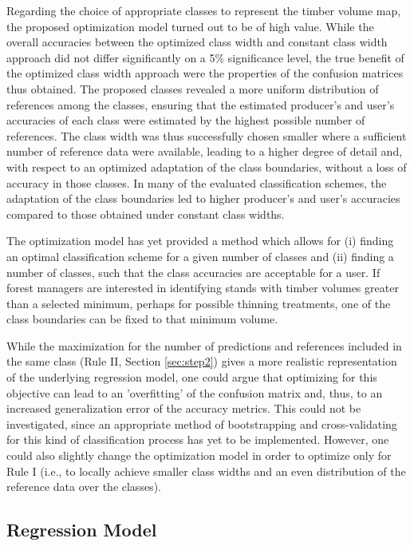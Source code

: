 Regarding the choice of appropriate classes to represent the timber volume map, the proposed optimization model turned out to be of high value. While the overall accuracies between the optimized class width and constant class width approach did not differ significantly on a 5\% significance level, the true benefit of the optimized class width approach were the properties of the confusion matrices thus obtained. The proposed classes revealed a more uniform distribution of references among the classes, ensuring that the estimated producer's and user's accuracies of each class were estimated by the highest possible number of references. The class width was thus successfully chosen smaller where a sufficient number of reference data were available, leading to a higher degree of detail and, with respect to an optimized adaptation of the class boundaries, without a loss of accuracy in those classes. In many of the evaluated classification schemes, the adaptation of the class boundaries led to higher producer's and user's accuracies compared to those obtained under constant class widths.\par
The optimization model has yet provided a method which allows for (i) finding an optimal classification scheme for a given number of classes and (ii) finding a number of classes, such that the class accuracies are acceptable for a user. If forest managers are interested in identifying stands with timber volumes greater than a selected minimum, perhaps for possible thinning treatments, one of the class boundaries can be fixed to that minimum volume.\par
While the maximization for the number of predictions and references included in the same class (Rule II, Section \ref{sec:step2}) gives a more realistic representation of the underlying regression model, one could argue that optimizing for this objective can lead to an 'overfitting' of the confusion matrix and, thus, to an increased generalization error of the accuracy metrics. This could not be investigated, since an appropriate method of bootstrapping and cross-validating for this kind of classification process has yet to be implemented. However, one could also slightly change the optimization model in order to optimize only for Rule I (i.e., to locally achieve smaller class widths and an even distribution of the reference data over the classes).

\subsection{Regression Model}
\label{sec:regmod}

